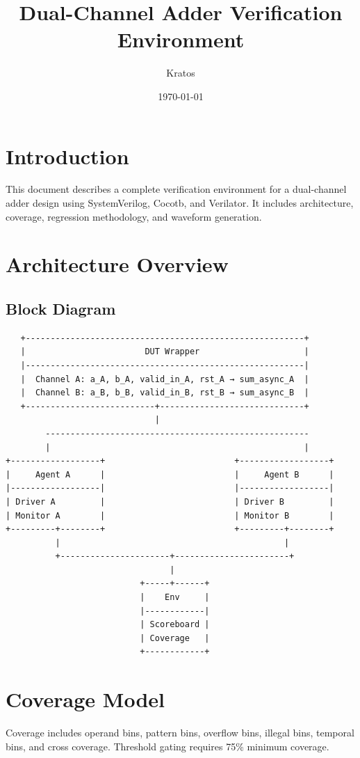 \documentclass[11pt]{article}
\title{Dual-Channel Adder Verification Environment}
\author{Kratos}
\date{\today}
\begin{document}
\maketitle

\tableofcontents
\newpage

\section{Introduction}
This document describes a complete verification environment for a dual-channel adder design using
SystemVerilog, Cocotb, and Verilator. It includes architecture, coverage, regression methodology,
and waveform generation.

\section{Architecture Overview}
\subsection{Block Diagram}
\begin{verbatim}
   +--------------------------------------------------------+
   |                        DUT Wrapper                     |
   |--------------------------------------------------------|
   |  Channel A: a_A, b_A, valid_in_A, rst_A → sum_async_A  |
   |  Channel B: a_B, b_B, valid_in_B, rst_B → sum_async_B  |
   +--------------------------+-----------------------------+
                              |
        -----------------------------------------------------
        |                                                   |
+------------------+                          +------------------+
|     Agent A      |                          |     Agent B      |
|------------------|                          |------------------|
| Driver A         |                          | Driver B         |
| Monitor A        |                          | Monitor B        |
+---------+--------+                          +---------+--------+
          |                                             |
          +----------------------+-----------------------+
                                 |
                           +-----+------+
                           |    Env     |
                           |------------|
                           | Scoreboard |
                           | Coverage   |
                           +------------+
\end{verbatim}

\section{Coverage Model}
Coverage includes operand bins, pattern bins, overflow bins, illegal bins, temporal bins, and
cross coverage. Threshold gating requires 75\% minimum coverage.
\end{document}

